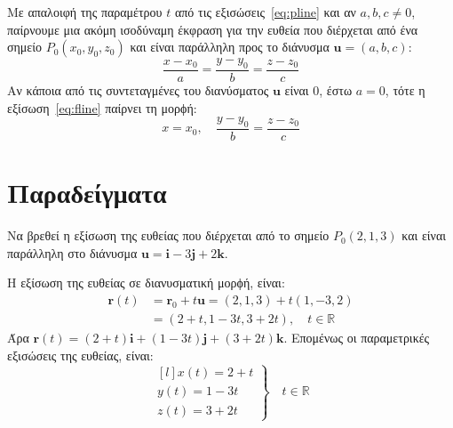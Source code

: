 \begin{rem}
  Με απαλοιφή της παραμέτρου $t$ από τις εξισώσεις~\eqref{eq:pline} και αν 
  $ a, b, c \neq 0 $, παίρνουμε μια ακόμη ισοδύναμη έκφραση για την ευθεία που 
  διέρχεται από ένα σημείο $ P_{0}(x_{0}, y_{0}, z_{0}) $ και είναι παράλληλη προς το 
  διάνυσμα $ \mathbf{u} = (a,b,c) $:
\begin{equation}\label{eq:fline}
  \boxed{\frac{x- x_{0}}{a} = \frac{y- y_{0}}{b} = \frac{z- z_{0}}{c}}
\end{equation}
Αν κάποια από τις συντεταγμένες του διανύσματος $ \mathbf{u} $ είναι 0, έστω $ a=0 $,
τότε η εξίσωση~\eqref{eq:fline} παίρνει τη μορϕή:
\[
  x = x_{0}, \quad \frac{y- y_{0}}{b} = \frac{z- z_{0}}{c}
\]
\end{rem}

\section*{Παραδείγματα}

\begin{example}
  Να βρεθεί η εξίσωση της ευθείας που διέρχεται από το σημείο $ P_{0}(2,1,3) $ 
  και είναι παράλληλη στο διάνυσμα 
  $ \mathbf{u} = \mathbf{i}- 3 \mathbf{j}+2 \mathbf{k} $.
\end{example}
\begin{solution}
  Η εξίσωση της ευθείας σε διανυσματική μορϕή, είναι:
  \begin{align*}
    \mathbf{r}(t) &= \mathbf{r}_{0} + t \mathbf{u} = (2,1,3) + t(1,-3,2) \\
                  &= (2+t,1-3t,3+2t), \quad t \in \mathbb{R}
  \end{align*} 
  Άρα $ \mathbf{r}(t) = (2+t) \mathbf{i} + (1-3t) \mathbf{j} + (3+2t) \mathbf{k} $. 
  Επομένως οι παραμετρικές εξισώσεις της ευθείας, είναι:
  \[
    \left.
      \begin{matrix*}[l]
        x(t) = 2+t \\
        y(t) = 1-3t \\
        z(t) = 3+2t
      \end{matrix*} 
    \right\} \quad  t \in \mathbb{R} 
  \]
\end{solution}


